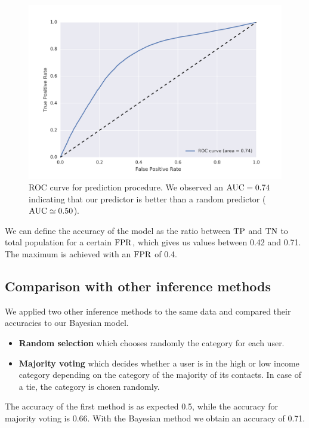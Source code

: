 

\begin{figure}[H]
\begin{center}
\includegraphics[width=\columnwidth]{figures/ROC_BETA/ROC_Beta_based_approach_201504.png}
\caption{ROC curve for prediction procedure. We observed an $\operatorname{AUC} = 0.74$ indicating that our predictor is better than a random predictor ($\operatorname{AUC} \simeq 0.50$).}
\label{ROC_multiclass}
\end{center}
\end{figure}

We can define the accuracy of the model as the ratio between \(\operatorname{TP}\) and \(\operatorname{TN}\) to total population for a certain \(\operatorname{FPR}\), which gives us values between \num{0.42} and \num{0.71}. The maximum is achieved with an \(\operatorname{FPR}\) of \num{0.4}.

\subsection{Comparison with other inference methods}

We applied two other inference methods to the same data and compared their accuracies to our Bayesian model.

\begin{itemize}
	\item \textbf{Random selection} which chooses randomly the category for each user.
	\item \textbf{Majority voting} which decides whether a user is in the high or low income category depending on the category of the majority of its contacts. In case of a tie, the category is chosen randomly.
\end{itemize}

The accuracy of the first method is as expected \num{0.5}, while the accuracy for majority voting is \num{0.66}. 
With the Bayesian method we obtain an accuracy of \num{0.71}.
